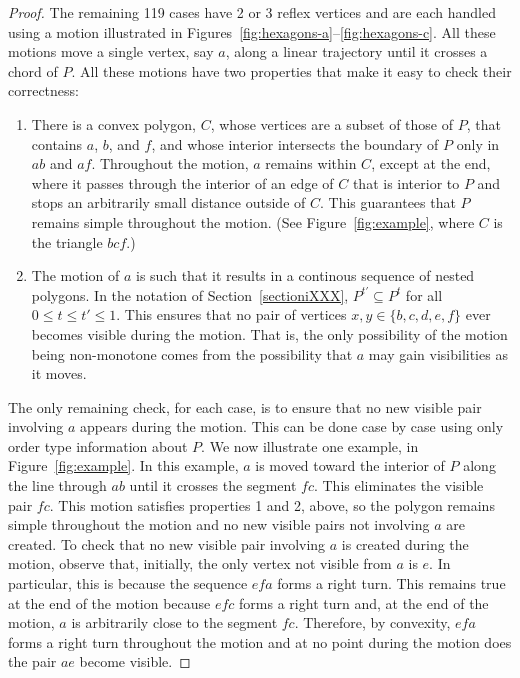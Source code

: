 \documentclass{article}
\begin{document}
\begin{proof}
The remaining 119 cases have 2 or 3 reflex vertices
and are each handled using a motion illustrated in
Figures~\ref{fig:hexagons-a}--\ref{fig:hexagons-c}.  All these motions
move a single vertex, say $a$, along a linear trajectory until it crosses
a chord of $P$.  All these motions have two properties that make it easy
to check their correctness:

\begin{enumerate}
\item There is a convex polygon, $C$, whose vertices are a subset of those
of $P$, that contains $a$, $b$, and $f$, and whose interior intersects
the boundary of $P$ only in $ab$ and $af$.   Throughout the motion,
$a$ remains within $C$, except at the end, where it passes through
the interior of an edge of $C$ that is interior to $P$ and stops an
arbitrarily small distance outside of $C$. This guarantees that $P$
remains simple throughout the motion.  (See Figure~\ref{fig:example},
where $C$ is the triangle $bcf$.)

\item The motion of $a$ is such that it results in a continous sequence of
nested polygons.  In the notation of Section~\ref{sectioniXXX},  $P^{t'}
\subseteq P^t$ for all $0\le t\le t'\le 1$.  This ensures that no pair of
vertices $x,y\in\{b,c,d,e,f\}$ ever becomes visible during the motion.
That is, the only possibility of the motion being non-monotone comes
from the possibility that $a$ may gain visibilities as it moves.
\end{enumerate}

The only remaining check, for each case, is to ensure that no new visible
pair involving $a$ appears during the motion. This can be done case by
case using only order type information about $P$.  We now illustrate
one example, in Figure~\ref{fig:example}.  In this example, $a$ is
moved toward the interior of $P$ along the line through $ab$ until
it crosses the segment $fc$.  This eliminates the visible pair $fc$.
This motion satisfies properties 1 and 2, above, so the polygon remains
simple throughout the motion and no new visible pairs not involving
$a$ are created.  To check that no new visible pair involving $a$ is
created during the motion, observe that, initially, the only vertex not
visible from $a$ is $e$.  In particular, this is because the sequence
$efa$ forms a right turn.  This remains true at the end of the motion
because $efc$ forms a right turn and, at the end of the motion, $a$
is arbitrarily close to the segment $fc$.  Therefore, by convexity,
$efa$ forms a right turn throughout the motion and at no point during
the motion does the pair $ae$ become visible.


\end{proof}
\end{document}
